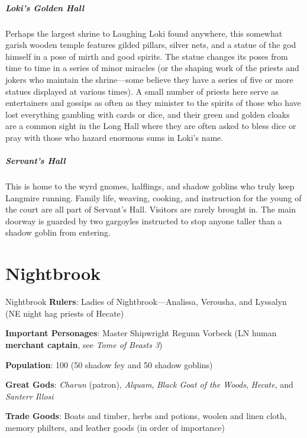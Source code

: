 \documentclass[10pt,a4paper,twoside,bg=print,twocolumn,openany,nodeprecatedcode]{dndbook}
\begin{document}
\subparagraph{Loki's Golden Hall}
Perhaps the largest shrine to Laughing Loki found anywhere, this somewhat garish wooden temple features gilded pillars, silver nets, and a statue of the god himself in a pose of mirth and good spirits. The statue changes its poses from time to time in a series of minor miracles (or the shaping work of the priests and jokers who maintain the shrine—some believe they have a series of five or more statues displayed at various times). A small number of priests here serve as entertainers and gossips as often as they minister to the spirits of those who have lost everything gambling with cards or dice, and their green and golden cloaks are a common sight in the Long Hall where they are often asked to bless dice or pray with those who hazard enormous sums in Loki's name.

\subparagraph{Servant's Hall}
This is home to the wyrd gnomes, halflings, and shadow goblins who truly keep Langmire running. Family life, weaving, cooking, and instruction for the young of the court are all part of Servant's Hall. Visitors are rarely brought in. The main doorway is guarded by two gargoyles instructed to stop anyone taller than a shadow goblin from entering.

\section{Nightbrook}
\begin{DndSidebar}[float=!b]{Nightbrook}
\textbf{Rulers}: Ladies of Nightbrook—Analissa, Verousha, and Lyssalyn (NE night hag priests of Hecate)



\textbf{Important Personages}: Master Shipwright Regunn Vorbeck (LN human \textbf{merchant captain}, see \textit{Tome of Beasts 3})



\textbf{Population}: 100 (50 shadow fey and 50 shadow goblins)



\textbf{Great Gods}: \textit{Charun} (patron), \textit{Alquam}, \textit{Black Goat of the Woods}, \textit{Hecate}, and \textit{Santerr Illosi}



\textbf{Trade Goods}: Boats and timber, herbs and potions, woolen and linen cloth, memory philters, and leather goods (in order of importance)





\end{DndSidebar}
\end{document}
